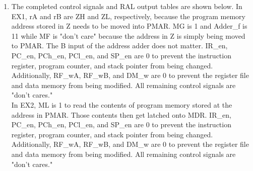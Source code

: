 \documentclass[11pt]{article}
\begin{document}
\begin{enumerate}[leftmargin=0.2in]
\begin{enumerate}
    \item The completed control signals and RAL output tables are shown below. In EX1, rA and rB are ZH and ZL, respectively, because the program memory address stored in Z needs to be moved into PMAR. MG is 1 and Adder\_f is 11 while MF is "don't care" because the address in Z is simply being moved to PMAR. The B input of the address adder does not matter. IR\_en, PC\_en, PCh\_en, PCl\_en, and SP\_en are 0 to prevent the instruction register, program counter, and stack pointer from being changed. Additionally, RF\_wA, RF\_wB, and DM\_w are 0 to prevent the register file and data memory from being modified. All remaining control signals are "don't cares." \\

      In EX2, ML is 1 to read the contents of program memory stored at the address in PMAR. Those contents then get latched onto MDR. IR\_en, PC\_en, PCh\_en, PCl\_en, and SP\_en are 0 to prevent the instruction register, program counter, and stack pointer from being changed. Additionally, RF\_wA, RF\_wB, and DM\_w are 0 to prevent the register file and data memory from being modified. All remaining control signals are "don't cares." \\


\end{enumerate}
\end{enumerate}
\end{document}
